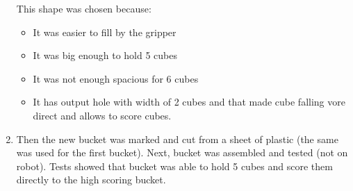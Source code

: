 \begin{enumerate}
  This shape was chosen because: 
  \begin{itemize}
  	\item It was easier to fill by the gripper
  	\item It was big enough to hold 5 cubes
  	\item It was not enough spacious for 6 cubes
  	\item It has output hole with width of 2 cubes and that made cube falling vore direct and allows to score cubes.  
  \end{itemize}
  \item Then the new bucket was marked and cut from a sheet of plastic (the same was used for the first bucket). Next, bucket was assembled and tested (not on robot). Tests showed that bucket was able to hold 5 cubes and score them directly to the high scoring bucket. 
  

\end{enumerate}
